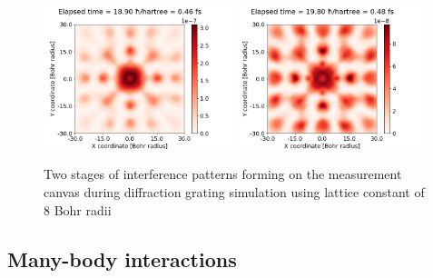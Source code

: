 \begin{figure}[hbt!]
	\begin{center}
		\includegraphics[width=0.49\textwidth]{figures/optical_grid_interference_01_8_grid.png}
		\includegraphics[width=0.49\textwidth]{figures/optical_grid_interference_02_8_grid.png}
		\caption{Two stages of interference patterns forming on the measurement canvas during diffraction grating simulation using lattice constant of $8$ Bohr radii}
		\label{fig:optical_grid_interference_8_grid}
	\end{center}	
\end{figure}

\subsection{Many-body interactions}

